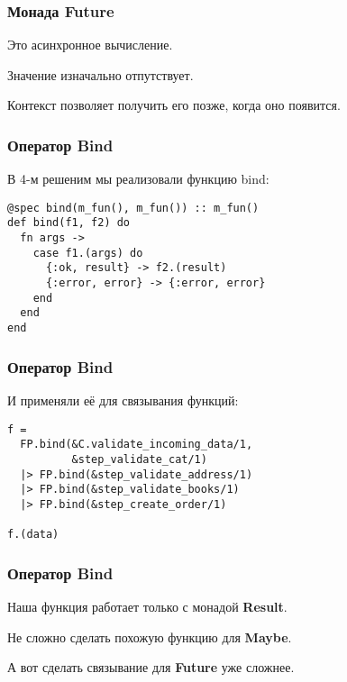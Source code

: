 \documentclass[10pt]{beamer}
\begin{document}
\begin{frame}
  \frametitle{Монада Future}
  Это асинхронное вычисление.
  \par \bigskip
  Значение изначально отпутствует.
  \par \bigskip
  Контекст позволяет получить его позже, когда оно появится.
\end{frame}

\begin{frame}[fragile]
  \frametitle{Оператор Bind}
  В 4-м решеним мы реализовали функцию bind:
  \par \bigskip
  \begin{lstlisting}
@spec bind(m_fun(), m_fun()) :: m_fun()
def bind(f1, f2) do
  fn args ->
    case f1.(args) do
      {:ok, result} -> f2.(result)
      {:error, error} -> {:error, error}
    end
  end
end
  \end{lstlisting}
\end{frame}

\begin{frame}[fragile]
  \frametitle{Оператор Bind}
  И применяли её для связывания функций:
  \par \bigskip
  \begin{lstlisting}
f =
  FP.bind(&C.validate_incoming_data/1,
          &step_validate_cat/1)
  |> FP.bind(&step_validate_address/1)
  |> FP.bind(&step_validate_books/1)
  |> FP.bind(&step_create_order/1)

f.(data)
  \end{lstlisting}
\end{frame}

\begin{frame}
  \frametitle{Оператор Bind}
  Наша функция работает только с монадой \textbf{Result}.
  \par \bigskip
  Не сложно сделать похожую функцию для \textbf{Maybe}.
  \par \bigskip
  А вот сделать связывание для \textbf{Future} уже сложнее.
\end{frame}
\end{document}
